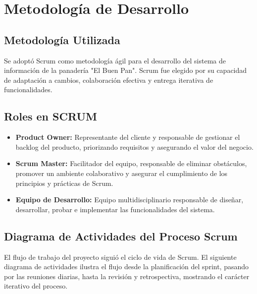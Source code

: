 \documentclass[conference]{IEEEtran}
\begin{document}
\section{Metodología de Desarrollo}
\subsection{Metodología Utilizada}

Se adoptó Scrum como metodología ágil para el desarrollo del sistema de información de la panadería "El Buen Pan". Scrum fue elegido por su capacidad de adaptación a cambios, colaboración efectiva y entrega iterativa de funcionalidades.

\subsection{Roles en SCRUM}
\begin{itemize}
    \item \textbf{Product Owner:} Representante del cliente y responsable de gestionar el backlog del producto, priorizando requisitos y asegurando el valor del negocio.
    \item \textbf{Scrum Master:} Facilitador del equipo, responsable de eliminar obstáculos, promover un ambiente colaborativo y asegurar el cumplimiento de los principios y prácticas de Scrum.
    \item \textbf{Equipo de Desarrollo:} Equipo multidisciplinario responsable de diseñar, desarrollar, probar e implementar las funcionalidades del sistema.
\end{itemize}

\subsection{Diagrama de Actividades del Proceso Scrum}
El flujo de trabajo del proyecto siguió el ciclo de vida de Scrum. El siguiente diagrama de actividades ilustra el flujo desde la planificación del sprint, pasando por las reuniones diarias, hasta la revisión y retrospectiva, mostrando el carácter iterativo del proceso.
\end{document}
